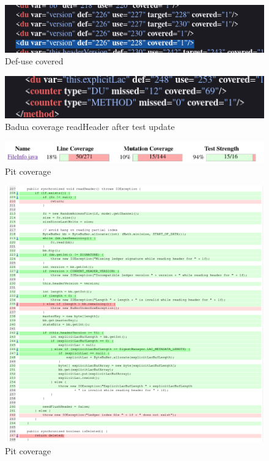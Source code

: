 \documentclass[12pt, a4paper]{article}
\begin{document}
  \begin{figure}
    \includegraphics[width=\linewidth]{./images/file_info/BaduaCoverageReadHeader3.png}
    \caption{Def-use covered}
    \label{fig:BaduaCoverageReadHeader3}
  \end{figure}

  \begin{figure}
    \includegraphics[width=\linewidth]{./images/file_info/BaduaCoverageReadHeader4.png}
    \caption{Badua coverage readHeader after test update}
    \label{fig:BaduaCoverageReadHeader4}
  \end{figure}

  \begin{figure}
    \includegraphics[width=\linewidth]{./images/file_info/PitCoverageReadHeader1.png}
    \caption{Pit coverage}
    \label{fig:PitCoverageReadHeader1}
  \end{figure}
  
  \begin{figure}
    \includegraphics[width=\linewidth]{./images/file_info/PitCoverageReadHeader2.png}
    \caption{Pit coverage}
    \label{fig:PitCoverageReadHeader2}
  \end{figure}
  
\end{document}
